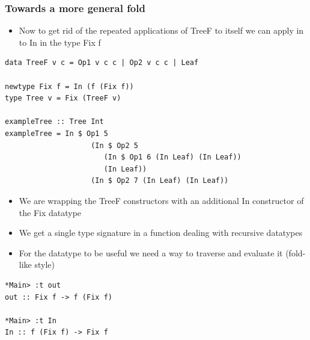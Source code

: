 \documentclass[10pt]{beamer}
\begin{document}
\begin{frame}[fragile]
\frametitle{Towards a more general fold}
\begin{itemize}
\item Now to get rid of the repeated applications of TreeF to itself we can apply in to In in the type Fix f
\end{itemize}

\begin{lstlisting}
data TreeF v c = Op1 v c c | Op2 v c c | Leaf

newtype Fix f = In (f (Fix f))
type Tree v = Fix (TreeF v)

exampleTree :: Tree Int
exampleTree = In $ Op1 5 
                    (In $ Op2 5 
                       (In $ Op1 6 (In Leaf) (In Leaf))
                       (In Leaf)) 
                    (In $ Op2 7 (In Leaf) (In Leaf))
\end{lstlisting}


\begin{itemize}
\item We are wrapping the TreeF constructors with an additional In constructor of the Fix datatype
\item We get a single type signature in a function dealing with recursive datatypes
\item For the datatype to be useful we need a way to traverse and evaluate it (fold-like style) 

\end{itemize}

\begin{lstlisting}
*Main> :t out 
out :: Fix f -> f (Fix f)

*Main> :t In
In :: f (Fix f) -> Fix f
\end{lstlisting}


\end{frame}
\end{document}
